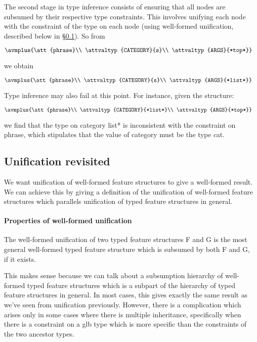\documentclass[12pt]{report}
\begin{document}
The second stage in type inference consists of ensuring that
all nodes are subsumed by their respective type constraints.
This involves unifying each node with the constraint 
of the type on each node (using
well-formed unification, described below in \S\ref{wfunif}).  So from
\begin{ex}
{\tiny $\avmplus{\att{phrase}\\
\attvaltyp{CATEGORY}{s}\\
\attvaltyp{ARGS}{*top*}}$}
\end{ex}
we obtain
\begin{ex}
{\tiny $\avmplus{\att{phrase}\\
\attvaltyp{CATEGORY}{s}\\
\attvaltyp{ARGS}{*list*}}$}
\end{ex}
Type inference may also fail at this point.  For instance, given
the structure:
\begin{ex}
{\tiny $\avmplus{\att{phrase}\\
\attvaltyp{CATEGORY}{*list*}\\
\attvaltyp{ARGS}{*top*}}$}
\end{ex}
we find that the type on {\feature category} {\type *list*} 
is inconsistent
with the constraint on {\type phrase},
which stipulates that the value of {\feature category} 
must be the type {\type cat}.


\subsection{Unification revisited}
\label{wfunif}

We want unification of well-formed feature structures to
give a well-formed result.
We can achieve this by giving a definition of the
unification of well-formed feature structures
which parallels unification of typed feature structures
in general.

\paragraph{Properties of well-formed unification}
The well-formed
unification of two typed feature structures F and G is the most general
well-formed typed feature structure which is subsumed by both F and G, if it
exists.

This makes sense because we can talk about a subsumption hierarchy
of well-formed typed feature structures which is a subpart of the
hierarchy of typed feature structures in general.
In most cases, this gives exactly the
same result as we've seen from unification previously.
However, there is a complication which arises only in some cases
where there is multiple inheritance, specifically 
when there is a constraint
on a glb type which is more specific than the constraints
of the two ancestor types. 
\end{document}
